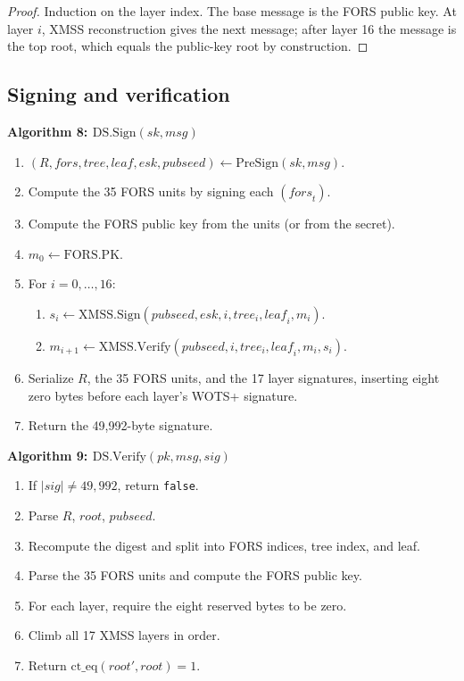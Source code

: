 \documentclass[11pt,a4paper]{article}
\theoremstyle{plain}
\theoremstyle{definition}
\theoremstyle{remark}
\newenvironment{steps}[1]
  {\par\medskip\noindent\textbf{#1}\par\nopagebreak\small
   \begin{enumerate}[label=\arabic*:,leftmargin=*]}
  {\end{enumerate}\par\medskip}
\begin{document}
\begin{proof}
Induction on the layer index.  The base message is the FORS public key.
At layer $i$, XMSS reconstruction gives the next message; after layer
16 the message is the top root, which equals the public-key root by
construction.
\end{proof}

\subsection{Signing and verification}

\begin{steps}{Algorithm 8: $\mathrm{DS.Sign}(sk,msg)$}
\item $(R,\mathit{fors},\mathit{tree},\mathit{leaf},esk,pubseed)
  \gets\mathrm{PreSign}(sk,msg)$.
\item Compute the 35 FORS units by signing each $(\mathit{fors}_t)$.
\item Compute the FORS public key from the units (or from the secret).
\item $m_0\gets\mathrm{FORS.PK}$.
\item For $i=0,\ldots,16$:
  \begin{enumerate}[label=\alph*)]
  \item $s_i\gets\mathrm{XMSS.Sign}(\mathit{pubseed},esk,i,
    \mathit{tree}_i,\mathit{leaf}_i,m_i)$.
  \item $m_{i+1}\gets\mathrm{XMSS.Verify}(\mathit{pubseed},i,
    \mathit{tree}_i,\mathit{leaf}_i,m_i,s_i)$.
  \end{enumerate}
\item Serialize $R$, the 35 FORS units, and the 17 layer signatures,
  inserting eight zero bytes before each layer's WOTS+ signature.
\item Return the 49,992-byte signature.
\end{steps}

\begin{steps}{Algorithm 9: $\mathrm{DS.Verify}(pk,msg,sig)$}
\item If $|sig|\ne49{,}992$, return \texttt{false}.
\item Parse $R$, $\mathit{root}$, $\mathit{pubseed}$.
\item Recompute the digest and split into FORS indices, tree index, and
  leaf.
\item Parse the 35 FORS units and compute the FORS public key.
\item For each layer, require the eight reserved bytes to be zero.
\item Climb all 17 XMSS layers in order.
\item Return $\mathrm{ct\_eq}(\mathit{root}',\mathit{root})=1$.
\end{steps}
\end{document}
